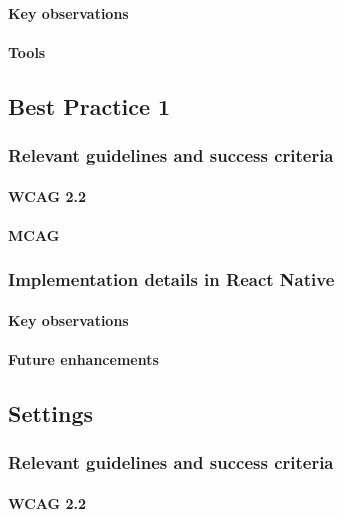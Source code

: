 \paragraph{Key observations}

\paragraph{Tools}

\subsection{Best Practice 1}

\subsubsection{Relevant guidelines and success criteria}

\paragraph{WCAG 2.2}

\paragraph{MCAG}

\subsubsection{Implementation details in React Native}

\paragraph{Key observations}

\paragraph{Future enhancements}

\subsection{Settings}

\subsubsection{Relevant guidelines and success criteria}

\paragraph{WCAG 2.2}

